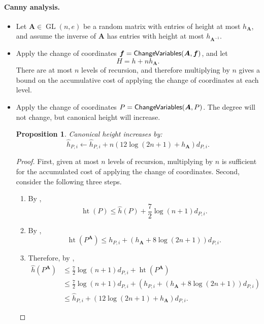 \documentclass[12pt]{article}
\def\mA{{\bm A}}
\DeclareMathOperator{\GL}{GL}
\DeclareMathOperator{\htt}{ht}
\def\td{(\textcolor{red}{{\bf todo}})}
\newtheorem{prop}[theorem]{Proposition}
\def\ChangeVariables{{\sf ChangeVariables}}
\def\Solve{{\sf Solve}}
\def\mA{{\bm A}}
\def\td{(\textcolor{red}{{\bf todo}})}
\begin{document}
\paragraph*{Canny analysis.}

\begin{itemize}




    \item Let $\bm A \in \GL(n,e)$ be a random matrix with entries of height at most $h_{\mA}$, and assume the inverse of $\bm A$ has entries with height at most $h_{\bm A^{-1}}$.




    \item Apply the change of coordinates $\bm f= \ChangeVariables(\bm A, \bm f)$, and let 
     \[
     H = h + nh_{\bm A}.
     \]
     There are at most $n$ levels of recursion, and therefore multiplying by $n$ gives a bound on the accumulative cost of applying the change of coordinates at each level. 



    \item Apply the change of coordinates $P = \ChangeVariables(\bm A, P)$. The degree will not change, but canonical height will increase.
    \begin{prop}\label{prop:coordinateChange}
        Canonical height increases by: \[\hat{h}_{P,i} \gets \hat{h}_{P,i}+n(12\log(2n+1)+h_{\mA})d_{P,i}.\]
    \end{prop}
    \begin{proof}
        First, given at most $n$ levels of recursion, multiplying by $n$ is sufficient for the accumulated cost of applying the change of coordinates. 
        Second, consider the following three steps.
        \begin{enumerate}
            \item By \cite[Proposition 2.39(5)]{EN}, 
            \[
            \htt(P) \leq \hat{h}(P) + \frac{7}{2}\log(n+1)d_{P,i}.
            \]
            \item By \cite[Proposition 2.4]{SharpEstimatesForTheEffectiveN},
            \[
            \htt(P^{\bm A}) \leq h_{P,i} + (h_{\bm A} + 8\log(2n+1))d_{P,i}.
            \]
            \item Therefore, by \cite[Proposition 2.39(5)]{EN},
            \begin{align*}
            \hat{h}(P^{\bm A}) &\leq \frac{7}{2}\log(n+1)d_{P,i} + \htt(P^{\bm A})\\
            &\leq \frac{7}{2}\log(n+1)d_{P,i} + \left(h_{P,i} + (h_{\bm A} + 8\log(2n+1))d_{P,i}\right)\\
            &\leq \hat{h}_{P,i}+(12\log(2n+1)+h_{\mA})d_{P,i}.
            \end{align*}
        \end{enumerate}
    \end{proof}



\end{itemize}
\end{document}
